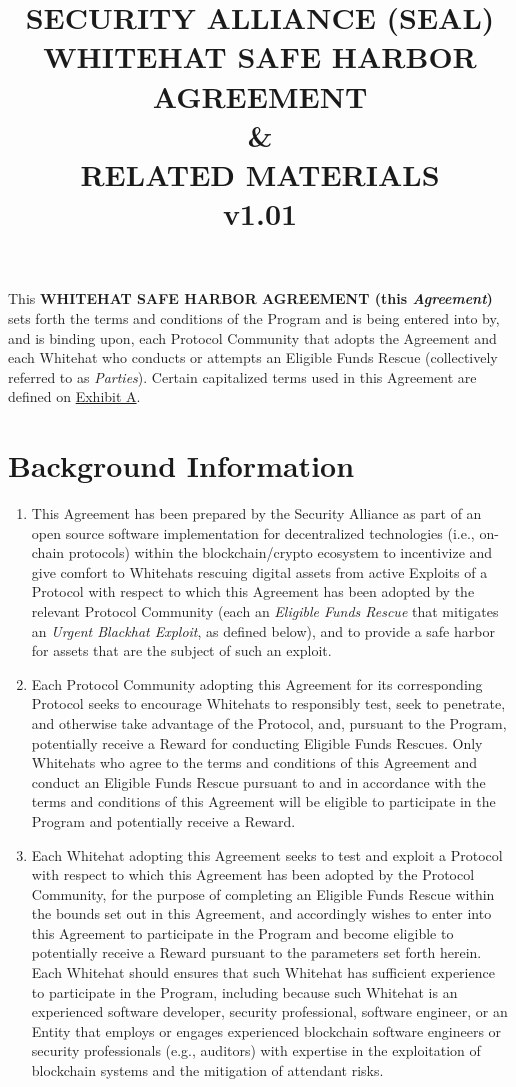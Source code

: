 \documentclass{article}
\title{
    \large
    SECURITY ALLIANCE (SEAL) \\[1ex]
    WHITEHAT SAFE HARBOR AGREEMENT \\
    \& \\
    RELATED MATERIALS \\[4ex]
    v1.01}
\author{}
\date{}
\begin{document}
\maketitle
\newpage

This \textbf{WHITEHAT SAFE HARBOR AGREEMENT (this \textit{Agreement})} sets forth the terms and conditions of the Program and is being entered into by, and is binding upon, each Protocol Community that adopts the Agreement and each Whitehat who conducts or attempts an Eligible Funds Rescue (collectively referred to as \textit{Parties}). Certain capitalized terms used in this Agreement are defined on \underline{Exhibit A}.

\section*{Background Information}\label{sec:background}

\begin{enumerate}[label=\Alph*.]
    \item This Agreement has been prepared by the Security Alliance as part of an open source software implementation for decentralized technologies (i.e., on-chain protocols) within the blockchain/crypto ecosystem to incentivize and give comfort to Whitehats rescuing digital assets from active Exploits of a Protocol with respect to which this Agreement has been adopted by the relevant Protocol Community (each an \textit{Eligible Funds Rescue} that mitigates an \textit{Urgent Blackhat Exploit}, as defined below), and to provide a safe harbor for assets that are the subject of such an exploit.

    \item Each Protocol Community adopting this Agreement for its corresponding Protocol seeks to encourage Whitehats to responsibly test, seek to penetrate, and otherwise take advantage of the Protocol, and, pursuant to the Program, potentially receive a Reward for conducting Eligible Funds Rescues. Only Whitehats who agree to the terms and conditions of this Agreement and conduct an Eligible Funds Rescue pursuant to and in accordance with the terms and conditions of this Agreement will be eligible to participate in the Program and potentially receive a Reward.

    \item Each Whitehat adopting this Agreement seeks to test and exploit a Protocol with respect to which this Agreement has been adopted by the Protocol Community, for the purpose of completing an Eligible Funds Rescue within the bounds set out in this Agreement, and accordingly wishes to enter into this Agreement to participate in the Program and become eligible to potentially receive a Reward pursuant to the parameters set forth herein. Each Whitehat should ensures that such Whitehat has sufficient experience to participate in the Program, including because such Whitehat is an experienced software developer, security professional, software engineer, or an Entity that employs or engages experienced blockchain software engineers or security professionals (e.g., auditors) with expertise in the exploitation of blockchain systems and the mitigation of attendant risks.
\end{enumerate}
\end{document}
